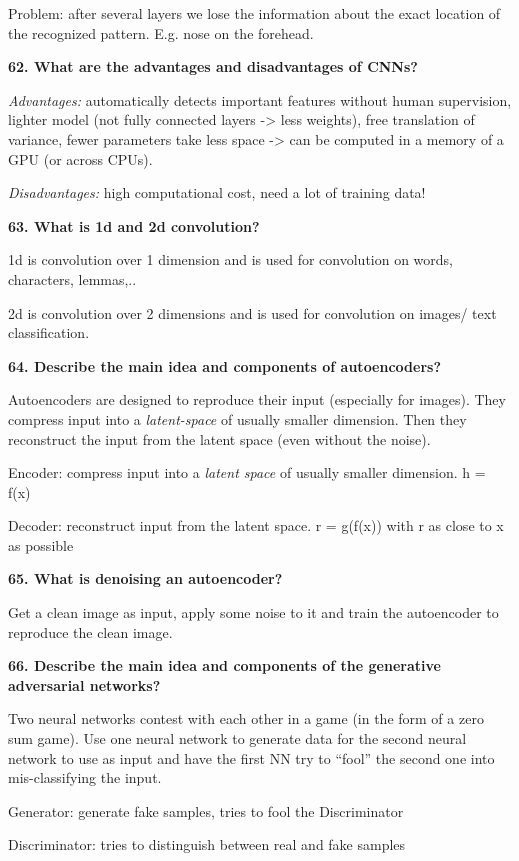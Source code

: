 Problem: after several layers we lose the information about the exact
location of the recognized pattern. E.g. nose on the forehead.

\textbf{62. What are the advantages and disadvantages of CNNs?}

\textit{Advantages:} automatically detects important features without
human supervision, lighter model (not fully connected layers
-\textgreater{} less weights), free translation of variance, fewer
parameters take less space -\textgreater{} can be computed in a memory
of a GPU (or across CPUs).

\textit{Disadvantages:} high computational cost, need a lot of
training data!

\textbf{63. What is 1d and 2d convolution?}

1d is convolution over 1 dimension and is used for convolution on words,
characters, lemmas,..

2d is convolution over 2 dimensions and is used for convolution on
images/ text classification.

\textbf{64. Describe the main idea and components of autoencoders?}

Autoencoders are designed to reproduce their input (especially for
images). They compress input into a \textit{latent-space} of usually
smaller dimension. Then they reconstruct the input from the latent space
(even without the noise).

Encoder: compress input into a \textit{latent space} of usually smaller
dimension. h = f(x)

Decoder: reconstruct input from the latent space. r = g(f(x)) with r as
close to x as possible

\textbf{65. What is denoising an autoencoder?}

Get a clean image as input, apply some noise to it and train the
autoencoder to reproduce the clean image.

\textbf{66. Describe the main idea and components of the generative
adversarial networks?}

Two neural networks contest with each other in a game (in the form of a
zero sum game). Use one neural network to generate data for the second
neural network to use as input and have the first NN try to ``fool'' the
second one into mis-classifying the input.

Generator: generate fake samples, tries to fool the Discriminator

Discriminator: tries to distinguish between real and fake samples

